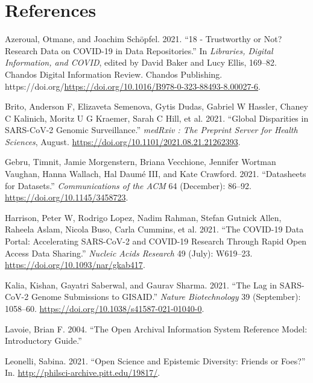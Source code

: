 \documentclass{article}
\newlength{\cslhangindent}
\newlength{\cslentryspacingunit} %
\newenvironment{CSLReferences}[2] %
 {%
  \setlength{\parindent}{0pt}
  \ifodd #1
  \let\oldpar\par
  \def\par{\hangindent=\cslhangindent\oldpar}
  \fi
  \setlength{\parskip}{#2\cslentryspacingunit}
 }%
 {}
\begin{document}
\hypertarget{references}{%
\section*{References}\label{references}}

\hypertarget{refs}{}
\begin{CSLReferences}{1}{0}
\leavevmode\hypertarget{ref-AZEROUAL2021169}{}%
Azeroual, Otmane, and Joachim Schöpfel. 2021. {``18 - Trustworthy or
Not? Research Data on COVID-19 in Data Repositories.''} In
\emph{Libraries, Digital Information, and COVID}, edited by David Baker
and Lucy Ellis, 169--82. Chandos Digital Information Review. Chandos
Publishing.
https://doi.org/\url{https://doi.org/10.1016/B978-0-323-88493-8.00027-6}.

\leavevmode\hypertarget{ref-Brito2021}{}%
Brito, Anderson F, Elizaveta Semenova, Gytis Dudas, Gabriel W Hassler,
Chaney C Kalinich, Moritz U G Kraemer, Sarah C Hill, et al. 2021.
{``Global Disparities in SARS-CoV-2 Genomic Surveillance.''}
\emph{medRxiv : The Preprint Server for Health Sciences}, August.
\url{https://doi.org/10.1101/2021.08.21.21262393}.

\leavevmode\hypertarget{ref-Gebru2021}{}%
Gebru, Timnit, Jamie Morgenstern, Briana Vecchione, Jennifer Wortman
Vaughan, Hanna Wallach, Hal Daumé III, and Kate Crawford. 2021.
{``Datasheets for Datasets.''} \emph{Communications of the ACM} 64
(December): 86--92. \url{https://doi.org/10.1145/3458723}.

\leavevmode\hypertarget{ref-Harrison2021}{}%
Harrison, Peter W, Rodrigo Lopez, Nadim Rahman, Stefan Gutnick Allen,
Raheela Aslam, Nicola Buso, Carla Cummins, et al. 2021. {``The COVID-19
Data Portal: Accelerating SARS-CoV-2 and COVID-19 Research Through Rapid
Open Access Data Sharing.''} \emph{Nucleic Acids Research} 49 (July):
W619--23. \url{https://doi.org/10.1093/nar/gkab417}.

\leavevmode\hypertarget{ref-Kalia2021}{}%
Kalia, Kishan, Gayatri Saberwal, and Gaurav Sharma. 2021. {``The Lag in
SARS-CoV-2 Genome Submissions to GISAID.''} \emph{Nature Biotechnology}
39 (September): 1058--60.
\url{https://doi.org/10.1038/s41587-021-01040-0}.

\leavevmode\hypertarget{ref-lavoie2004open}{}%
Lavoie, Brian F. 2004. {``The Open Archival Information System Reference
Model: Introductory Guide.''}

\leavevmode\hypertarget{ref-pittphilsci19817}{}%
Leonelli, Sabina. 2021. {``Open Science and Epistemic Diversity: Friends
or Foes?''} In. \url{http://philsci-archive.pitt.edu/19817/}.


\end{CSLReferences}
\end{document}
